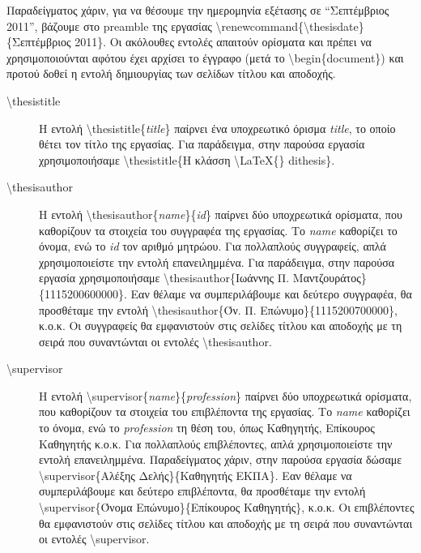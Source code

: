 \documentclass{dithesis}
\begin{document}
            Παραδείγματος χάριν, για να θέσουμε την ημερομηνία εξέτασης σε ``Σεπτέμβριος
            2011'', βάζουμε στο preamble της εργασίας 
            \textbackslash{renewcommand}\{\textbackslash{thesisdate}\}\{Σεπτέμβριος 2011\}.
            Οι ακόλουθες εντολές απαιτούν ορίσματα και πρέπει να χρησιμοποιούνται αφότου
            έχει αρχίσει το έγγραφο (μετά το \textbackslash{begin}\{document\}) και προτού
            δοθεί η εντολή δημιουργίας των σελίδων τίτλου και αποδοχής.
            \begin{description}
            \item[\textbackslash{thesistitle}]
                Η εντολή \textbackslash{thesistitle}\{\textit{title}\} παίρνει ένα 
                υποχρεωτικό όρισμα \textit{title}, το οποίο θέτει τον τίτλο της εργασίας.
                Για παράδειγμα, στην παρούσα εργασία χρησιμοποιήσαμε
                \textbackslash{thesistitle}\{Η κλάσση \textbackslash{LaTeX}\{\} dithesis\}.
            \item[\textbackslash{thesisauthor}]
                Η εντολή \textbackslash{thesisauthor}\{\textit{name}\}\{\textit{id}\} παίρνει
                δύο υποχρεωτικά ορίσματα, που καθορίζουν τα στοιχεία του συγγραφέα της
                εργασίας.
                Το \textit{name} καθορίζει το όνομα, ενώ το \textit{id} τον αριθμό μητρώου.
                Για πολλαπλούς συγγραφείς, απλά χρησιμοποιείστε την εντολή επανειλημμένα.
                Για παράδειγμα, στην παρούσα εργασία χρησιμοποιήσαμε
                \textbackslash{thesisauthor}\{Ιωάννης Π. Μαντζουράτος\}\{1115200600000\}.
                Εαν θέλαμε να συμπεριλάβουμε και δεύτερο συγγραφέα, θα προσθέταμε την εντολή 
                \textbackslash{thesisauthor}\{Όν. Π. Επώνυμο\}\{1115200700000\}, κ.ο.κ.
                Οι συγγραφείς θα εμφανιστούν στις σελίδες τίτλου και αποδοχής με τη σειρά
                που συναντώνται οι εντολές \textbackslash{thesisauthor}.
            \item[\textbackslash{supervisor}]
                Η εντολή \textbackslash{supervisor}\{\textit{name}\}\{\textit{profession}\} 
                παίρνει δύο υποχρεωτικά ορίσματα, που καθορίζουν τα στοιχεία του επιβλέποντα
                της εργασίας.
                Το \textit{name} καθορίζει το όνομα, ενώ το \textit{profession} τη θέση του,
                όπως Καθηγητής, Επίκουρος Καθηγητής κ.ο.κ.
                Για πολλαπλούς επιβλέποντες, απλά χρησιμοποιείστε την εντολή επανειλημμένα.
                Παραδείγματος χάριν, στην παρούσα εργασία δώσαμε
                \textbackslash{supervisor}\{Αλέξης Δελής\}\{Καθηγητής ΕΚΠΑ\}.
                Εαν θέλαμε να συμπεριλάβουμε και δεύτερο επιβλέποντα, θα προσθέταμε την 
                εντολή \textbackslash{supervisor}\{Όνομα Επώνυμο\}\{Επίκουρος Καθηγητής\}, 
                κ.ο.κ.
                Οι επιβλέποντες θα εμφανιστούν στις σελίδες τίτλου και αποδοχής με τη σειρά
                που συναντώνται οι εντολές \textbackslash{supervisor}.
            \end{description}
\end{document}
